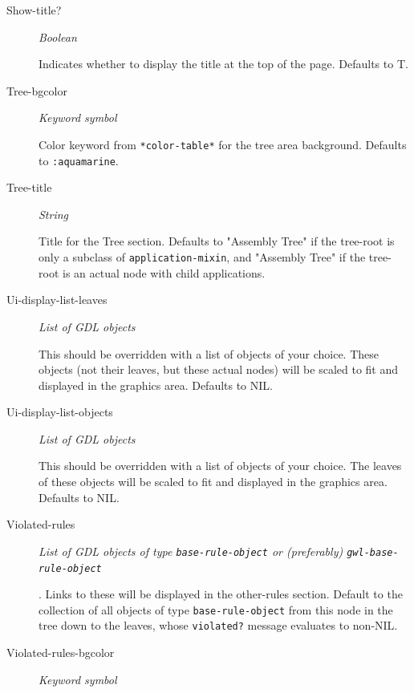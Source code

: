 \documentclass [11pt]{book}
\begin{document}
\begin{itemize}
\begin{description}
\item [Show-title?]
\emph{Boolean}

 Indicates whether to display the title at the top of the page. Defaults to T.




\item [Tree-bgcolor]
\emph{Keyword symbol}

 Color keyword from \texttt{*color-table*} for the tree area background. Defaults to \texttt{:aquamarine}.




\item [Tree-title]
\emph{String}

 Title for the Tree section. Defaults to "Assembly Tree" if the tree-root is only a
subclass of \texttt{application-mixin}, and "Assembly Tree" if the tree-root is an actual node with
child applications.




\item [Ui-display-list-leaves]
\emph{List of GDL objects}

 This should be overridden with a list of objects of your choice. These objects (not their leaves,
but these actual nodes) will be scaled to fit and displayed in the graphics area. Defaults to NIL.




\item [Ui-display-list-objects]
\emph{List of GDL objects}

 This should be overridden with a list of objects of your choice. The leaves of these objects will
be scaled to fit and displayed in the graphics area. Defaults to NIL.




\item [Violated-rules]
\emph{List of GDL objects of type \texttt{base-rule-object} or (preferably) \texttt{gwl-base-rule-object}}

.
Links to these will be displayed in the other-rules section. Default to the collection of all objects of type
\texttt{base-rule-object} from this node in the tree down to the leaves, whose \texttt{violated?} message
evaluates to non-NIL.




\item [Violated-rules-bgcolor]
\emph{Keyword symbol}


\end{description}
\end{itemize}
\end{document}
